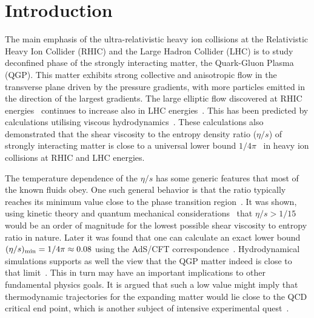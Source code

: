 \documentclass[ALICE,manyauthors]{cernphprep}
\begin{document}


\section{Introduction}


The main emphasis of the ultra-relativistic heavy ion collisions at the Relativistic Heavy Ion Collider (RHIC) and the Large Hadron Collider (LHC) is to study deconfined phase of the strongly interacting matter, the Quark-Gluon Plasma (QGP). 
This matter exhibits strong collective and anisotropic flow in the transverse plane driven by the pressure gradients, with more particles emitted in the direction of the largest gradients.
The large elliptic flow discovered at RHIC energies~\cite{Ackermann:2000tr} continues to increase also in LHC energies~\cite{Aamodt:2010pa,Adam:2016izf}. This has been predicted by calculations utilising viscous hydrodynamics~\cite{Romatschke:2007mq,Shen:2011eg,Schenke:2011zz,Bozek:2012qs,Gale:2012rq,Hirano:2010je}.
These calculations also demonstrated that the shear viscosity to the entropy density ratio ($\eta/s$) of strongly interacting matter is close to a universal lower bound $1/4\pi$~\cite{Kovtun:2004de} in heavy ion collisions at RHIC and LHC energies.

The temperature dependence of the $\eta/s$ has some generic features that most of the known fluids obey. One such general behavior is that the ratio typically reaches its minimum value close to the phase transition region~\cite{Lacey:2006bc}. 
It was shown, using kinetic theory and quantum mechanical considerations~\cite{PhysRevD.31.53} that $\eta/s>1/15$ would be an order of magnitude for the lowest possible shear viscosity to entropy ratio in nature. Later it was found that one can calculate an exact lower bound $(\eta/s)_{\rm min}=1/4\pi\approx0.08$ using the AdS/CFT correspondence~\cite{Kovtun:2004de}. Hydrodynamical simulations supports as well the view that the QGP matter indeed is close to that limit~\cite{Gale:2012rq}. This in turn may have an important implications to other fundamental physics goals. It is argued that such a low value might imply that thermodynamic trajectories for the expanding matter would lie close to the QCD critical end point, which is another subject of intensive experimental quest~\cite{Lacey:2006bc}.
\end{document}

